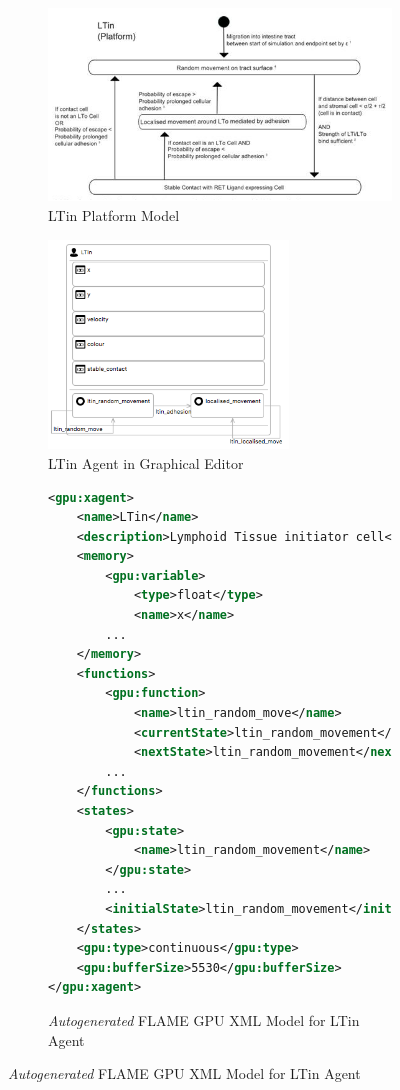 \documentclass{UoYCSproject}
\begin{document}
\begin{figure}[htp]
\centering

\begin{subfigure}{0.49\textwidth}
\centering
\includegraphics[width=\textwidth]{Appendix/Models/LTin_Cropped}
\caption{LTin Platform Model\cite{kieran_thesis}}
\label{fig:ltin_cropped}
\end{subfigure}
\begin{subfigure}{0.49\textwidth}
\centering
\includegraphics[width=0.7\textwidth]{Appendix/Models/LTin_GMF}
\caption{LTin Agent in Graphical Editor}
\label{fig:ltin_gmf}
\end{subfigure}

\begin{subfigure}{0.75\textwidth}
\centering
\begin{lstlisting}[language=XML, basicstyle=\tiny]
<gpu:xagent>
    <name>LTin</name>
    <description>Lymphoid Tissue initiator cell</description>
    <memory>
        <gpu:variable>
            <type>float</type>
            <name>x</name>
        ...
    </memory>
    <functions>
        <gpu:function>
            <name>ltin_random_move</name>
            <currentState>ltin_random_movement</currentState>
            <nextState>ltin_random_movement</nextState>
        ...
    </functions>
    <states>
        <gpu:state>
            <name>ltin_random_movement</name>
        </gpu:state>
        ...
        <initialState>ltin_random_movement</initialState>
    </states>
    <gpu:type>continuous</gpu:type>
    <gpu:bufferSize>5530</gpu:bufferSize>
</gpu:xagent>
\end{lstlisting}
\caption{\textit{Autogenerated} \gls{FLAME GPU} XML Model for LTin Agent}
\end{subfigure}


\end{figure}
\end{document}
